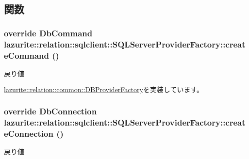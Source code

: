 \subsection{関数}
\hypertarget{classlazurite_1_1relation_1_1sqlclient_1_1_s_q_l_server_provider_factory_a2d33338154ebbd3abcfc8ca58aba0402}{
\subsubsection[{createCommand}]{\setlength{\rightskip}{0pt plus 5cm}override DbCommand lazurite::relation::sqlclient::SQLServerProviderFactory::createCommand ()}}
\label{classlazurite_1_1relation_1_1sqlclient_1_1_s_q_l_server_provider_factory_a2d33338154ebbd3abcfc8ca58aba0402}
\begin{DoxyReturn}{戻り値}

\end{DoxyReturn}


\hyperlink{classlazurite_1_1relation_1_1common_1_1_d_b_provider_factory_a80d5a53dcf06278b37133c7013f02f71}{lazurite::relation::common::DBProviderFactory}を実装しています。\hypertarget{classlazurite_1_1relation_1_1sqlclient_1_1_s_q_l_server_provider_factory_aa4c5aa8059304c9ff54addb81f6bf755}{
\subsubsection[{createConnection}]{\setlength{\rightskip}{0pt plus 5cm}override DbConnection lazurite::relation::sqlclient::SQLServerProviderFactory::createConnection ()}}
\label{classlazurite_1_1relation_1_1sqlclient_1_1_s_q_l_server_provider_factory_aa4c5aa8059304c9ff54addb81f6bf755}
\begin{DoxyReturn}{戻り値}

\end{DoxyReturn}


